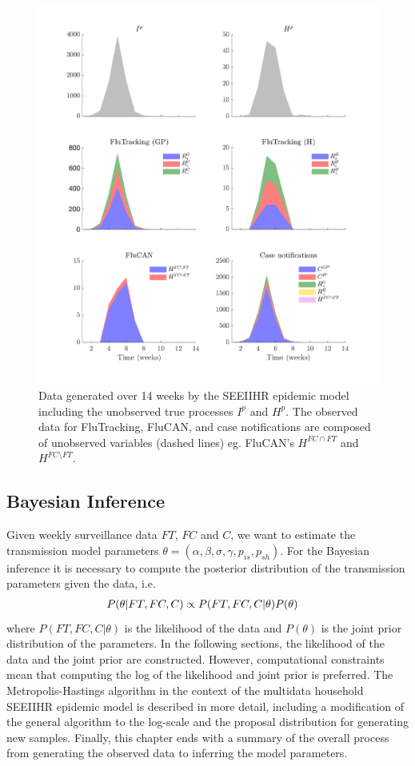 \begin{figure}[h!]
	\includegraphics[scale=0.75]{Figs/allDataPlot.png}
	\caption{Data generated over 14 weeks by the SEEIIHR epidemic model including the unobserved true processes $I^p$ and $H^p$. The observed data for FluTracking, FluCAN, and case notifications are composed of unobserved variables (dashed lines) eg. FluCAN's $H^{FC\cap FT}$ and $H^{FC\setminus FT}$.}
	\label{fig: synthetic data}
\end{figure}


\subsection{Bayesian Inference}
Given weekly surveillance data $FT$, $FC$ and $C$, we want to estimate the transmission model parameters $\theta = (\alpha, \beta, \sigma, \gamma, p_{is}, p_{sh})$. For the Bayesian inference it is necessary to compute the posterior distribution of the transmission parameters given the data, i.e.
\begin{align} \notag
P(\theta | FT, FC, C) &\propto P(FT, FC, C | \theta) P(\theta)
\end{align}
where $P(FT, FC, C|\theta)$ is the likelihood of the data and $P(\theta)$ is the joint prior distribution of the parameters. In the following sections, the likelihood of the data and the joint prior are constructed. However, computational constraints mean that computing the log of the likelihood and joint prior is preferred. The Metropolis-Hastings algorithm in the context of the multidata household SEEIIHR epidemic model is described in more detail, including a modification of the general algorithm to the log-scale and the proposal distribution for generating new samples. Finally, this chapter ends with a summary of the overall process from generating the observed data to inferring the model parameters.

